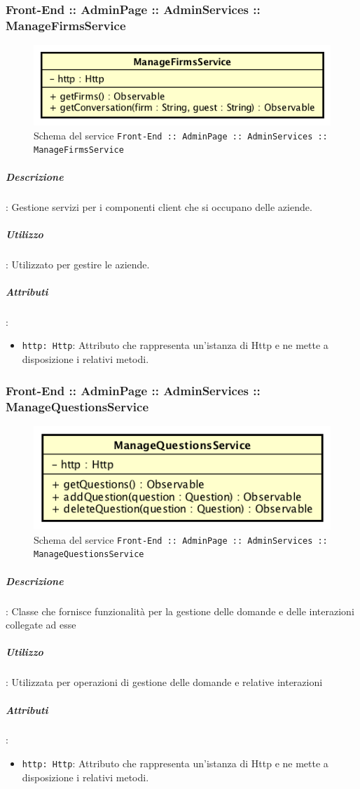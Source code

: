 \documentclass[../ManualeSviluppatore_v1.0.0.tex]{subfiles}
\begin{document}
		      	\subsubsection{Front-End :: AdminPage :: AdminServices :: ManageFirmsService}
				\begin{figure}[!h]
					\centering
					\includegraphics[scale=0.6]{Architettura/Front-End/AdminPage/AdminServices/ManageFirmsService.png}
					\caption{Schema del service \texttt{Front-End :: AdminPage :: AdminServices :: ManageFirmsService}}
				\end{figure}
			      	\subparagraph{Descrizione}: Gestione servizi per i componenti client che si occupano delle aziende.
			      	\subparagraph{Utilizzo}: Utilizzato per gestire le aziende.
			      	\subparagraph{Attributi}:
      	      		\begin{itemize}
						\item \texttt{http: Http}: Attributo che rappresenta un'istanza di Http e ne mette a disposizione i relativi metodi.
	      	      	\end{itemize}
\newpage
				\subsubsection{Front-End :: AdminPage :: AdminServices :: ManageQuestionsService}
				\begin{figure}[!h]
					\centering
					\includegraphics[scale=0.6]{Architettura/Front-End/AdminPage/AdminServices/ManageQuestionsService.png}
					\caption{Schema del service \texttt{Front-End :: AdminPage :: AdminServices :: ManageQuestionsService}}
				\end{figure}

					\subparagraph{Descrizione}: Classe che fornisce funzionalità per la gestione delle domande e delle interazioni collegate ad esse
					\subparagraph{Utilizzo}: Utilizzata per operazioni di gestione delle domande e relative interazioni
					\subparagraph{Attributi}:
			      	\begin{itemize}
						\item \texttt{http: Http}: Attributo che rappresenta un'istanza di Http e ne mette a disposizione i relativi metodi.
			      	\end{itemize}
\newpage
\end{document}
